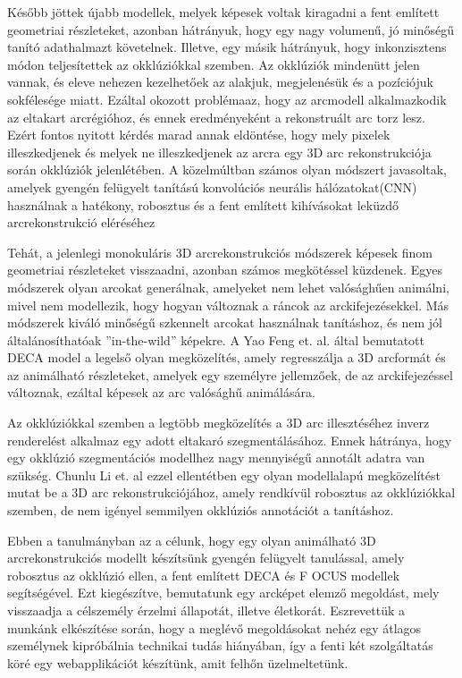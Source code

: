 \documentclass[12pt,a4]{article}
\begin{document}
	 Később jöttek újabb modellek, melyek képesek voltak kiragadni a fent
	 említett geometriai részleteket, azonban hátrányuk, hogy egy nagy volumenű,
	 jó minőségű tanító adathalmazt követelnek. Illetve, egy másik hátrányuk, hogy inkonzisztens módon teljesítettek az okklúziókkal szemben. Az okklúziók mindenütt jelen vannak, és eleve nehezen kezelhetőek az alakjuk, megjelenésük és a pozíciójuk sokfélesége miatt. Ezáltal okozott problémaaz, hogy az arcmodell alkalmazkodik az eltakart arcrégióhoz, és ennek eredményeként a rekonstruált arc torz lesz. Ezért fontos nyitott kérdés marad annak eldöntése, hogy mely pixelek illeszkedjenek és melyek ne illeszkedjenek az arcra egy 3D arc rekonstrukciója során okklúziók jelenlétében. A közelmúltban számos olyan módszert javasoltak, amelyek gyengén felügyelt tanítású konvolúciós neurális hálózatokat(CNN) használnak a hatékony, robosztus és a fent említett kihívásokat leküzdő arcrekonstrukció eléréséhez
	 
	 Tehát, a jelenlegi monokuláris 3D arcrekonstrukciós módszerek képesek
	 finom geometriai részleteket visszaadni, azonban számos megkötéssel
	 küzdenek. Egyes módszerek olyan arcokat generálnak, amelyeket nem
	 lehet valósághűen animálni, mivel nem modellezik, hogy hogyan változnak
	 a ráncok az arckifejezésekkel. Más módszerek kiváló minőségű szkennelt
	 arcokat használnak tanításhoz, és nem jól általánosíthatóak ”in-the-wild” képekre. A Yao Feng et. al. \cite{deca} által bemutatott DECA model a legelső olyan megközelítés, amely regresszálja a 3D arcformát és az animálható részleteket, amelyek egy személyre jellemzőek, de az arckifejezéssel változnak, ezáltal képesek az arc valósághű animálására.
	 
	 Az okklúziókkal szemben a legtöbb megközelítés a 3D arc illesztéséhez
	 inverz renderelést alkalmaz egy adott eltakaró szegmentálásához. Ennek
	 hátránya, hogy egy okklúzió szegmentációs modellhez nagy mennyiségű annotált adatra van szükség. Chunlu Li et. al \cite{focus} ezzel ellentétben egy olyan modellalapú megközelítést mutat be a 3D arc rekonstrukciójához, amely rendkívül robosztus az okklúziókkal szemben, de nem igényel semmilyen okklúziós annotációt a tanításhoz.
	 
	 Ebben a tanulmányban az a célunk, hogy egy olyan animálható 3D arcrekonstrukciós modellt készítsünk gyengén felügyelt tanulással, amely robosztus az okklúzió ellen, a fent említett DECA és F OCUS modellek
	 segítségével. Ezt kiegészítve, bemutatunk egy arcképet elemző megoldást,
	 mely visszaadja a célszemély érzelmi állapotát, illetve életkorát. Eszrevettük a munkánk elkészítése során, hogy a meglévő megoldásokat nehéz egy átlagos személynek kipróbálnia technikai tudás hiányában, így a fenti két szolgáltatás köré egy webapplikációt készítünk, amit felhőn üzelmeltetünk.
	 
\end{document}
